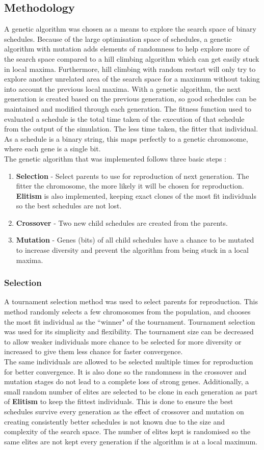\documentclass{article}
\newcommand{\n}[0]{\\[\baselineskip]}
\begin{document}
\subsection{Methodology}
A genetic algorithm was chosen as a means to explore the search space of binary schedules. Because of the large optimisation space of schedules, a genetic algorithm with mutation adds elements of randomness to help explore more of the search space compared to a hill climbing algorithm which can get easily stuck in local maxima. Furthermore, hill climbing with random restart will only try to explore another unrelated area of the search space for a maximum without taking into account the previous local maxima. With a genetic algorithm, the next generation is created based on the previous generation, so good schedules can be maintained and modified through each generation. The fitness function used to evaluated a schedule is the total time taken of the execution of that schedule from the output of the simulation. The less time taken, the fitter that individual. As a schedule is a binary string, this maps perfectly to a genetic chromosome, where each gene is a single bit.
\n
The genetic algorithm that was implemented follows three basic steps \cite{ga}:
\begin{enumerate}
\item \textbf{Selection} - Select parents to use for reproduction of next generation. The fitter the chromosome, the more likely it will be chosen for reproduction. \textbf{Elitism} is also implemented, keeping exact clones of the most fit individuals so the best schedules are not lost.
\item \textbf{Crossover} - Two new child schedules are created from the parents.
\item \textbf{Mutation} - Genes (bits) of all child schedules have a chance to be mutated to increase diversity and prevent the algorithm from being stuck in a local maxima.
\end{enumerate}
\subsubsection{Selection}
A tournament selection method was used to select parents for reproduction. This method randomly selects a few chromosomes from the population, and chooses the most fit individual as the ``winner" of the tournament. Tournament selection was used for its simplicity and flexibility. The tournament size can be decreased to allow weaker individuals more chance to be selected for more diversity or increased to give them less chance for faster convergence. 
\n
The same individuals are allowed to be selected multiple times for reproduction for better convergence. It is also done so the randomness in the crossover and mutation stages do not lead to a complete loss of strong genes. Additionally, a small random number of elites are selected to be clone in each generation as part of \textbf{Elitism} to keep the fittest individuals. This is done to ensure the best schedules survive every generation as the effect of crossover and mutation on creating consistently better schedules is not known due to the size and complexity of the search space. The number of elites kept is randomised so the same elites are not kept every generation if the algorithm is at a local maximum.
\end{document}
